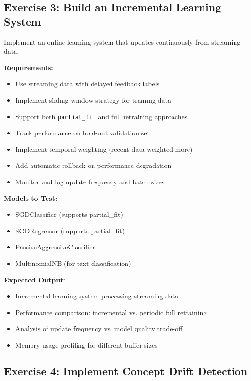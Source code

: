 \subsection{Exercise 3: Build an Incremental Learning System}

Implement an online learning system that updates continuously from streaming data.

\textbf{Requirements:}
\begin{itemize}
    \item Use streaming data with delayed feedback labels
    \item Implement sliding window strategy for training data
    \item Support both \texttt{partial\_fit} and full retraining approaches
    \item Track performance on hold-out validation set
    \item Implement temporal weighting (recent data weighted more)
    \item Add automatic rollback on performance degradation
    \item Monitor and log update frequency and batch sizes
\end{itemize}

\textbf{Models to Test:}
\begin{itemize}
    \item SGDClassifier (supports partial\_fit)
    \item SGDRegressor (supports partial\_fit)
    \item PassiveAggressiveClassifier
    \item MultinomialNB (for text classification)
\end{itemize}

\textbf{Expected Output:}
\begin{itemize}
    \item Incremental learning system processing streaming data
    \item Performance comparison: incremental vs. periodic full retraining
    \item Analysis of update frequency vs. model quality trade-off
    \item Memory usage profiling for different buffer sizes
\end{itemize}

\subsection{Exercise 4: Implement Concept Drift Detection}

